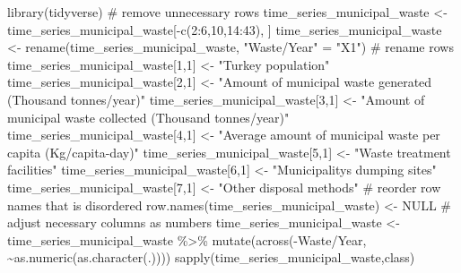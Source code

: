 \documentclass[
  11pt,
  a4paper,
  DIV=11,
  numbers=noendperiod]{scrartcl}
\newenvironment{Shaded}{\begin{snugshade}}{\end{snugshade}}
\newcommand{\AttributeTok}[1]{\textcolor[rgb]{0.40,0.45,0.13}{#1}}
\newcommand{\CommentTok}[1]{\textcolor[rgb]{0.37,0.37,0.37}{#1}}
\newcommand{\ConstantTok}[1]{\textcolor[rgb]{0.56,0.35,0.01}{#1}}
\newcommand{\DecValTok}[1]{\textcolor[rgb]{0.68,0.00,0.00}{#1}}
\newcommand{\FunctionTok}[1]{\textcolor[rgb]{0.28,0.35,0.67}{#1}}
\newcommand{\NormalTok}[1]{\textcolor[rgb]{0.00,0.23,0.31}{#1}}
\newcommand{\OtherTok}[1]{\textcolor[rgb]{0.00,0.23,0.31}{#1}}
\newcommand{\SpecialCharTok}[1]{\textcolor[rgb]{0.37,0.37,0.37}{#1}}
\newcommand{\StringTok}[1]{\textcolor[rgb]{0.13,0.47,0.30}{#1}}
\begin{document}
\begin{Shaded}
\begin{Highlighting}[]
\FunctionTok{library}\NormalTok{(tidyverse)}
\CommentTok{\# remove unnecessary rows}
\NormalTok{time\_series\_municipal\_waste }\OtherTok{\textless{}{-}}\NormalTok{ time\_series\_municipal\_waste[}\SpecialCharTok{{-}}\FunctionTok{c}\NormalTok{(}\DecValTok{2}\SpecialCharTok{:}\DecValTok{6}\NormalTok{,}\DecValTok{10}\NormalTok{,}\DecValTok{14}\SpecialCharTok{:}\DecValTok{43}\NormalTok{), ]}
\NormalTok{time\_series\_municipal\_waste }\OtherTok{\textless{}{-}} \FunctionTok{rename}\NormalTok{(time\_series\_municipal\_waste, }\StringTok{"Waste/Year"} \OtherTok{=} \StringTok{"X1"}\NormalTok{)}
\CommentTok{\# rename rows}
\NormalTok{time\_series\_municipal\_waste[}\DecValTok{1}\NormalTok{,}\DecValTok{1}\NormalTok{] }\OtherTok{\textless{}{-}} \StringTok{"Turkey population"}
\NormalTok{time\_series\_municipal\_waste[}\DecValTok{2}\NormalTok{,}\DecValTok{1}\NormalTok{] }\OtherTok{\textless{}{-}} \StringTok{"Amount of municipal waste generated (Thousand tonnes/year)"}
\NormalTok{time\_series\_municipal\_waste[}\DecValTok{3}\NormalTok{,}\DecValTok{1}\NormalTok{] }\OtherTok{\textless{}{-}} \StringTok{"Amount of municipal waste collected (Thousand tonnes/year)"}
\NormalTok{time\_series\_municipal\_waste[}\DecValTok{4}\NormalTok{,}\DecValTok{1}\NormalTok{] }\OtherTok{\textless{}{-}} \StringTok{"Average amount of municipal waste per capita (Kg/capita{-}day)"}
\NormalTok{time\_series\_municipal\_waste[}\DecValTok{5}\NormalTok{,}\DecValTok{1}\NormalTok{] }\OtherTok{\textless{}{-}} \StringTok{"Waste treatment facilities"}
\NormalTok{time\_series\_municipal\_waste[}\DecValTok{6}\NormalTok{,}\DecValTok{1}\NormalTok{] }\OtherTok{\textless{}{-}} \StringTok{"Municipality\textquotesingle{}s dumping sites"}
\NormalTok{time\_series\_municipal\_waste[}\DecValTok{7}\NormalTok{,}\DecValTok{1}\NormalTok{] }\OtherTok{\textless{}{-}} \StringTok{"Other disposal methods"}
\CommentTok{\# reorder row names that is disordered}
\FunctionTok{row.names}\NormalTok{(time\_series\_municipal\_waste) }\OtherTok{\textless{}{-}} \ConstantTok{NULL}
\CommentTok{\# adjust necessary columns as numbers}
\NormalTok{time\_series\_municipal\_waste }\OtherTok{\textless{}{-}}\NormalTok{ time\_series\_municipal\_waste }\SpecialCharTok{\%\textgreater{}\%}
  \FunctionTok{mutate}\NormalTok{(}\FunctionTok{across}\NormalTok{(}\SpecialCharTok{{-}}\StringTok{\textasciigrave{}}\AttributeTok{Waste/Year}\StringTok{\textasciigrave{}}\NormalTok{, }\SpecialCharTok{\textasciitilde{}}\FunctionTok{as.numeric}\NormalTok{(}\FunctionTok{as.character}\NormalTok{(.))))}
\FunctionTok{sapply}\NormalTok{(time\_series\_municipal\_waste,class)}
\end{Highlighting}
\end{Shaded}
\end{document}
